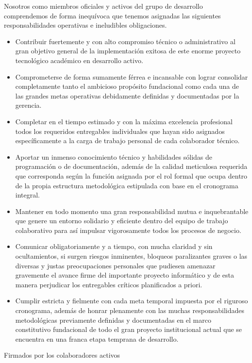 \documentclass[11pt,spanish]{article}
\begin{document}
Nosotros como miembros oficiales y activos del grupo de desarrollo comprendemos de forma inequívoca que tenemos asignadas las siguientes responsabilidades operativas e ineludibles obligaciones.

\begin{itemize}
    \item Contribuir fuertemente y con alto compromiso técnico o administrativo al gran objetivo general de la implementación exitosa de este enorme proyecto tecnológico académico en desarrollo activo.
    \item Comprometerse de forma sumamente férrea e incansable con lograr consolidar completamente tanto el ambicioso propósito fundacional como cada una de las grandes metas operativas debidamente definidas y documentadas por la gerencia.
    \item Completar en el tiempo estimado y con la máxima excelencia profesional todos los requeridos entregables individuales que hayan sido asignados específicamente a la carga de trabajo personal de cada colaborador técnico.
    \item Aportar un inmenso conocimiento técnico y habilidades sólidas de programación o de documentación, además de la calidad meticulosa requerida que corresponda según la función asignada por el rol formal que ocupa dentro de la propia estructura metodológica estipulada con base en el cronograma integral.
    \item Mantener en todo momento una gran responsabilidad mutua e inquebrantable que genere un entorno solidario y eficiente dentro del equipo de trabajo colaborativo para así impulsar vigorosamente todos los procesos de negocio.
    \item Comunicar obligatoriamente y a tiempo, con mucha claridad y sin ocultamientos, si surgen riesgos inminentes, bloqueos paralizantes graves o las diversas y justas preocupaciones personales que pudiesen amenazar gravemente el avance firme del importante proyecto informático y de esta manera perjudicar los entregables críticos planificados a priori.
    \item Cumplir estricta y fielmente con cada meta temporal impuesta por el riguroso cronograma, además de honrar plenamente con las muchas responsabilidades metodológicas previamente definidas y documentadas en el marco constitutivo fundacional de todo el gran proyecto institucional actual que se encuentra en una franca etapa temprana de desarrollo.
\end{itemize}

Firmados por los colaboradores activos
\end{document}
